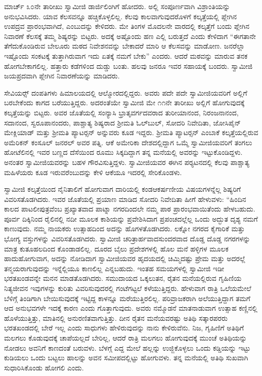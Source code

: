  ಮಾರ್ಚ್ ೩೦ನೇ ತಾರೀಖು ಸ್ವಾಮೀಜಿ ಡಾರ್ಜಿಲಿಂಗಿಗೆ ಹೋದರು. ಅಲ್ಲಿ ಸಂಪೂರ್ಣವಾಗಿ ವಿಶ್ರಾಂತಿಯನ್ನು ಅನುಭವಿಸಿದರು. ಯಾವ ಕೆಲಸವನ್ನೂ ಹಚ್ಚಿಕೊಳ್ಳಲಿಲ್ಲ. ಕೆಲವು ಕಾಲವಾಗುವುದರೊಳಗೆ ಕಲ್ಕತ್ತೆಯಲ್ಲಿ ಪ್ಲೇಗಿನ ಉಪದ್ರವ ಪ್ರಾರಂಭವಾಗಿದೆ, ಎಂಬುದನ್ನು ಕೇಳಿದರು. ಮೇ ತಿಂಗಳ ಮೊದಲನೇ ವಾರದಲ್ಲಿ ಕಲ್ಕತ್ತೆಗೆ ಬಂದು ಪ್ಲೇಗಿನ ನಿವಾರಣೆ ಕೆಲಸಕ್ಕೆ ತಮ್ಮ ಶಿಷ್ಯರನ್ನು ಬಿಟ್ಟರು. ಅದಕ್ಕೆ ಅಷ್ಟೊಂದು ಹಣ ಎಲ್ಲಿ ಬರುತ್ತದೆ ಎಂದು ಕೇಳಿದಾಗ “ಈಗತಾನೇ ತೆಗೆದುಕೊಂಡಿರುವ ಬೇಲೂರು ಮಠದ ನಿವೇಶನವನ್ನು ಬೇಕಾದರೆ ಮಾರಿ ಆ ಕೆಲಸವನ್ನು ಮಾಡೋಣ. ಜನರೆಲ್ಲಾ ಇಷ್ಟೊಂದು ಸಂಕಟಕ್ಕೆ ತುತ್ತಾಗಿರುವಾಗ ಇದು ಏತಕ್ಕೆ ನಮಗೆ ಬೇಕು” ಎಂದರು. ಆದರೆ ಮಠವನ್ನು ಮಾರುವ ತನಕ ಹೋಗಬೇಕಾಗಲಿಲ್ಲ. ಹತ್ತಾರು ಕಡೆಗಳಿಂದ ದುಡ್ಡು ಬಂತು. ಹಲವು ಜನರೂ ಇವರ ಸಹಾಯಕ್ಕೆ ಬಂದರು. ಸ್ವಾಮೀಜಿ ಜಯಪ್ರದವಾಗಿ ಪ್ಲೇಗಿನ ನಿವಾರಣೆಯನ್ನು ಮಾಡಿದರು. 

 ಸೇವಿಯರ್ಸ್‍‍ ದಂಪತಿಗಳು ಹಿಮಾಲಯದಲ್ಲಿ ಆಲ್ಮೋರದಲ್ಲಿದ್ದರು. ಅವರು ಪದೇ ಪದೇ ಸ್ವಾಮೀಜಿಯವರಿಗೆ ಅಲ್ಲಿಗೆ ಬರಬೇಕೆಂದು ಕಾಗದ ಬರೆಯುತ್ತಿದ್ದರು. ಅದರಂತೆಯೇ ಸ್ವಾಮೀಜಿ ಮೇ ೧೧ನೇ ತಾರೀಖು ಅಲ್ಲಿಗೆ ಹೋಗುವುದಕ್ಕೆ ಕಲ್ಕತ್ತೆಯನ್ನು ಬಿಟ್ಟರು. ಅವರ ಜೊತೆಯಲ್ಲಿ ಸಂನ್ಯಾಸಿ ಭ್ರಾತೃವರ್ಗದವರಾದ ತುರೀಯಾನಂದ, ನಿರಂಜನಾನಂದ, ಸದಾನಂದ, ಸ್ವರೂಪಾನಂದರು, ಪಾಶ್ಚಾತ್ಯ ಶಿಷ್ಯರಾದ ಶ‍್ರೀಮತಿ ಓಲ್‍ಬುಲ್, ಸೋದರಿ ನಿವೇದಿತಾ, ಜೋಸಿಪೈನ್ ಮೇಕ್ಲಿಯಾಡ್ ಮತ್ತು ಶ‍್ರೀಮತಿ ಪ್ಯಾಟರ್‍ಸನ್ ಅನ್ನುವರು ಕೂಡ ಇದ್ದರು. ಶ‍್ರೀಮತಿ ಪ್ಯಾಟರ್‍ಸನ್ ಎಂಬಾಕೆ ಕಲ್ಕತ್ತೆಯಲ್ಲಿರುವ ಅಮೆರಿಕನ್ ಕಂಸೂಲ್ ಜನರಲ್ ಅವರ ಪತ್ನಿ. ಆಕೆ ಅಮೇರಿಕಾ ದೇಶದಲ್ಲಿದ್ದಾಗ ಒಮ್ಮೆ ಸ್ವಾಮೀಜಿಯವರಿಗೆ ತಂಗಲು ಹೋಟೆಲಿನಲ್ಲಿ ಇವರ ಬಣ್ಣದ ದೆಸೆಯಿಂದ ರೂಮು ಸಿಕ್ಕದಿದ್ದಾಗ ತನ್ನ ಮನೆಯಲ್ಲಿ ಅವರನ್ನು ಇಟ್ಟುಕೊಂಡಿದ್ದಳು. ಅನಂತರ ಸ್ವಾಮೀಜಿಯವರನ್ನು ಬಹಳ ಗೌರವಿಸುತ್ತಿದ್ದಳು. ಸ್ವಾಮೀಜಿಯವರ ಈಗಿನ ಪರ‍್ಯಟನದಲ್ಲಿ ಕೆಲವು ಪಾಶ್ಚಾತ್ಯ ಮಹಿಳೆಯರು ಕೂಡ ಇರುವರೆಂಬುದನ್ನು ಕೇಳಿ ಆಕೆಯೂ ಇದರಲ್ಲಿ ಸೇರಿಕೊಂಡಳು. 

 ಸ್ವಾಮೀಜಿ ಕಲ್ಕತ್ತೆಯಿಂದ ನೈನಿತಾಲಿಗೆ ಹೋಗುವಾಗ ದಾರಿಯಲ್ಲಿ ಕಂಡ\break ಆಕರ್ಷಣೀಯ ವಿಷಯಗಳನ್ನೆಲ್ಲ ಶಿಷ್ಯರಿಗೆ ವಿವರಿಸತೊಡಗಿದರು. ಇವರ ಜೊತೆಯಲ್ಲಿ ಪ್ರಯಾಣ ಮಾಡಿದ ಸೋದರಿ ನಿವೇದಿತಾ ಹೀಗೆ ಹೇಳುವಳು: “ಹಿಂದಿನ ಕಾಲದ ಪಾಟಲೀಪುತ್ರವೆಂಬ ಪ್ರಖ್ಯಾತವಾದ ಪಾಟ್ನಾ ನಗರದಿಂದಲೇ ನಮ್ಮ ಪಾಠ ಪ್ರಾರಂಭವಾಯಿತೆಂದು ಹೇಳಬಹುದು. ಪೂರ್ವ ದಿಕ್ಕಿನಿಂದ ರೈಲಿನಲ್ಲಿ ನದೀ ಮೂಲಕ ಕಾಶಿಯನ್ನು ಪ್ರವೇಶಿಸಿದಾಗ ಪ್ರಪಂಚದಲ್ಲೆಲ್ಲ ಒಂದು ಅದ್ಭುತ ದೃಶ್ಯ ನಮಗೆ ಕಾಣುವುದು. ನಮ್ಮ ನಾಯಕರು ಉತ್ಸಾಹದಿಂದ ಅದನ್ನು ಹೊಗಳತೊಡಗಿದರು. ಲಕ್ನೋ ನಗರದ ಕೈಗಾರಿಕೆ ಮತ್ತು ಭೋಗ್ಯ ವಸ್ತುಗಳನ್ನು ವಿವರಿಸತೊಡಗಿದರು. ಸ್ವಾಮೀಜಿ ಚರಿತ್ರಾರ್ಹವಾದ\break ಸುಂದರವಾದ ದೊಡ್ಡ ದೊಡ್ಡ ನಗರಗಳನ್ನು ಮಾತ್ರ ಕುತೂಹಲದಿಂದ ಕೊಂಡಾಡಲಿಲ್ಲ. ದೂರದ ಬೈಲು ಪ್ರದೇಶಗಳಲ್ಲಿ ಹೊಲ ಮನೆ ಹಳ್ಳಿಗಳ ಮೂಲಕ ಹಾದುಹೋಗುವಾಗ, ಅದನ್ನು ನೋಡಿದಾಗ ಸ್ವಾಮೀಜಿಯವರ ಹೃದಯದಲ್ಲಿ ಚಿಮ್ಮಿದಷ್ಟು ಪ್ರೇಮ ಮತ್ತು ಅದರಲ್ಲೆ ತನ್ಮಯರಾಗುವುದನ್ನು ಇನ್ನೆಲ್ಲಿಯೂ ಕಾಣಲಿಲ್ಲ ಎನ್ನಬಹುದು. ಇಂತಹ ಸಮಯಗಳಲ್ಲಿ ಸ್ವಾಮೀಜಿ ಇಡೀ ಭರತಖಂಡವನ್ನೇ ಮನನ ಮಾಡತೊಡಗಿದರು. ಸಮುದಾಯದ ಒಕ್ಕಲುತನ, ರೈತನ ಮನೆಯಲ್ಲಿರುವ ಗೃಹಿಣಿಯ ನಿತ್ಯಜೀವನ ಇವುಗಳನ್ನು ಕುರಿತು ವಿವರಿಸುವುದರಲ್ಲಿ ಗಂಟೆಗಟ್ಟಲೆ ಕಳೆಯುತ್ತಿದ್ದರು. ಹೇಳುವಾಗ ರಾತ್ರಿ ಒಲೆಯಮೇಲೆ ಬೆಳಿಗ್ಗೆ ತಿಂಡಿಗಾಗಿ ಬೇಯಿಸುವುದಕ್ಕೆ ಇಟ್ಟಿದ್ದ ಕಾಳನ್ನೂ ಮರೆಯುತ್ತಿರಲಿಲ್ಲ. ಪರಿವ್ರಾಜಕರಾಗಿ ಅಲೆಯುತ್ತಿದ್ದಾಗ ತಮಗೆ ಆದ ಅನುಭವಗಳೇ ಇದಕ್ಕೆ ಕಾರಣ ಎಂದು ಗೊತ್ತಾಗುವುದು. ಅವರು ನಮ್ಮೊಡನೆ ಮಾತನಾಡುವಾಗ ಉತ್ಸಾಹ ಕಣ್ಣಿನಲ್ಲಿ ಹೊಳೆಯುತ್ತಿತ್ತು, ಮಾತಿನಲ್ಲಿ ಅನುರಣಿತವಾಗುತ್ತಿತ್ತು. ದೀನ ರೈತನ ಮನೆಯವರಷ್ಟು ಅತಿಥಿ ಸತ್ಕಾರಪರರು ಭರತಖಂಡದಲ್ಲಿ ಬೇರೆ ಇಲ್ಲ ಎಂದು ಸಾಧುಗಳು ಹೇಳಿರುವುದನ್ನು ನಾನು ಕೇಳಿರುವೆನು. ನಿಜ, ಗೃಹಿಣಿಗೆ ಅತಿಥಿಗೆ ಮಲಗಲು ಕೊಡುವುದಕ್ಕೆ ಚಾಪೆಯಲ್ಲದೆ ಬೇರಿಲ್ಲ, ಆದರೆ ರಾತ್ರಿ ಮಲಗಲು ಹೋಗುವುದಕ್ಕೆ ಮುಂಚೆ ಅತಿಥಿಯನ್ನು ನೋಡಲು ಅವನಿಗೆ ಕಾಣದಂತೆ ಬರುವಳು. ಬೆಳಗ್ಗೆ ಎದ್ದ ಮೇಲೆ ಹಲ್ಲನ್ನು ಉಜ್ಜಿಕೊಳ್ಳಲು ಒಂದು ಕಡ್ಡಿಯನ್ನು ಇಟ್ಟು ಕುಡಿಯಲು ಒಂದು ಬಟ್ಟಲು ಹಾಲನ್ನು ಅವನ ಸಮೀಪದಲ್ಲಿಟ್ಟು ಹೋಗುವಳು. ತನ್ನ ಮನೆಯಲ್ಲಿ ಅತಿಥಿ ಸುಖವಾಗಿ ಸುಧಾರಿಸಿಕೊಂಡು ಹೋಗಲಿ ಎಂದು. 

